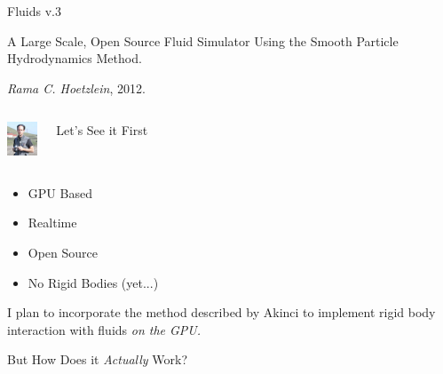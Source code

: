 \documentclass[12pt]{beamer}
\begin{document}
\begin{frame}[t]{Fluids v.3}

\pause

A Large Scale, Open Source Fluid Simulator Using the Smooth Particle Hydrodynamics Method.

\textit{Rama C. Hoetzlein}, 2012.


\pause

\begin{columns}
\begin{center}\includegraphics[height=1cm]{Hoetzlein}\end{center} \pause
{}
\color{white} Let's See it First \pause
\end{columns}

\vspace{8pt}

\begin{itemize}
\item GPU Based \pause \checkmark \pause
\item Realtime \pause \checkmark \pause
\item \color{green} Open Source \pause \checkmark \pause
\item \color{orange} No Rigid Bodies \pause (yet...)
\end{itemize}

\pause

\color{white}
\small{I plan to incorporate the method described by Akinci to implement rigid body interaction with fluids \emph{on the GPU.}}


\end{frame}



\begin{frame}[plain]{}

\begin{center}
But How Does it \emph{Actually} Work?
\end{center}

\end{frame}

\end{document}
